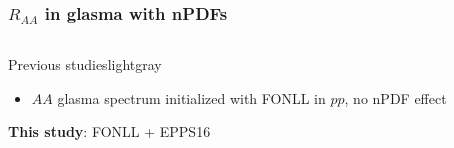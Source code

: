 \documentclass[aspectratio=169,11pt,usenames,dvipsnames]{beamer}
\begin{document}

\begin{frame}
    \frametitle{$R_{AA}$ in glasma with nPDFs}
    \vspace{-15pt}
    \begin{center}
        \begin{columns}[onlytextwidth,t]
           \begin{center}
                \begin{custombox2}{\normalsize Previous studies}{lightgray}
                    \small
                    \begin{varwidth}{0.88\textwidth}
                    \begin{itemize}\itemsep0em 
                        \itemsep0em
                        \footnotesize
                        \item $AA$ glasma spectrum initialized with FONLL in $pp$, no nPDF effect
                    \end{itemize}
                    \end{varwidth}
                \end{custombox2}
                \begin{untitledcustombox}
                    \begin{varwidth}{0.88\textwidth}
                        \hspace{10pt}\normalsize{\bfseries\color{palteal} This study}: FONLL + {\color{palteal}EPPS16}\hspace{10pt}
                    \end{varwidth}
                \end{untitledcustombox}
            \end{center}
            \vspace{-15pt}
            \begin{center}
                \begin{tikzpicture}[]

\end{tikzpicture}
\end{center}
\end{columns}
\end{center}
\end{frame}
\end{document}
